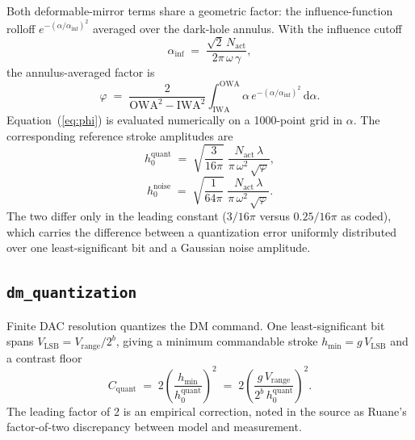 Both deformable-mirror terms share a geometric factor: the influence-function
rolloff $e^{-(\alpha/\alpha_{\mathrm{inf}})^2}$ averaged over the dark-hole
annulus. With the influence cutoff
%
\begin{equation}
  \alpha_{\mathrm{inf}} \;=\; \frac{\sqrt{2}\, N_{\mathrm{act}}}{2\pi\,\omega\,\gamma},
  \label{eq:alphainf}
\end{equation}
%
the annulus-averaged factor is
%
\begin{equation}
  \varphi
  \;=\;
  \frac{2}{\mathrm{OWA}^2 - \mathrm{IWA}^2}
  \int_{\mathrm{IWA}}^{\mathrm{OWA}}
  \alpha \, e^{-(\alpha/\alpha_{\mathrm{inf}})^2} \, \mathrm{d}\alpha .
  \label{eq:phi}
\end{equation}
%
Equation~(\ref{eq:phi}) is evaluated numerically on a 1000-point grid in
$\alpha$. The corresponding reference stroke amplitudes are
%
\begin{equation}
  h_0^{\mathrm{quant}} \;=\; \sqrt{\frac{3}{16\pi}}\;
    \frac{N_{\mathrm{act}}\,\lambda}{\pi\,\omega^2\,\sqrt{\varphi}} ,
  \label{eq:h0quant}
\end{equation}
\begin{equation}
  h_0^{\mathrm{noise}} \;=\; \sqrt{\frac{1}{64\pi}}\;
    \frac{N_{\mathrm{act}}\,\lambda}{\pi\,\omega^2\,\sqrt{\varphi}} .
  \label{eq:h0noise}
\end{equation}
%
The two differ only in the leading constant ($3/16\pi$ versus $0.25/16\pi$ as
coded), which carries the difference between a quantization error uniformly
distributed over one least-significant bit and a Gaussian noise amplitude.

\subsection{\texttt{dm\_quantization}}

Finite DAC resolution quantizes the DM command. One least-significant bit spans
$V_{\mathrm{LSB}} = V_{\mathrm{range}}/2^{b}$, giving a minimum commandable
stroke $h_{\min} = g\,V_{\mathrm{LSB}}$ and a contrast floor
%
\begin{equation}
  C_{\mathrm{quant}}
  \;=\;
  2\left(\frac{h_{\min}}{h_0^{\mathrm{quant}}}\right)^{\!2}
  \;=\;
  2\left(\frac{g\,V_{\mathrm{range}}}{2^{b}\,h_0^{\mathrm{quant}}}\right)^{\!2} .
  \label{eq:cquant}
\end{equation}
%
The leading factor of 2 is an empirical correction, noted in the source as
Ruane's factor-of-two discrepancy between model and measurement.

